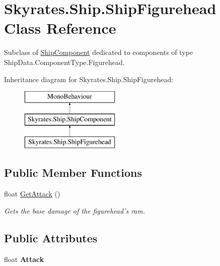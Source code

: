 \hypertarget{class_skyrates_1_1_ship_1_1_ship_figurehead}{\section{Skyrates.\-Ship.\-Ship\-Figurehead Class Reference}
\label{class_skyrates_1_1_ship_1_1_ship_figurehead}
}


Subclass of \hyperlink{class_skyrates_1_1_ship_1_1_ship_component}{Ship\-Component} dedicated to components of type Ship\-Data.\-Component\-Type.\-Figurehead.  


Inheritance diagram for Skyrates.\-Ship.\-Ship\-Figurehead\-:\begin{figure}[H]
\begin{center}
\leavevmode
\includegraphics[height=3.000000cm]{class_skyrates_1_1_ship_1_1_ship_figurehead}
\end{center}
\end{figure}
\subsection*{Public Member Functions}
\begin{DoxyCompactItemize}
\item 
float \hyperlink{class_skyrates_1_1_ship_1_1_ship_figurehead_adad224a00966a31095b2b1be9f627b17}{Get\-Attack} ()
\begin{DoxyCompactList}\small\item\em Gets the base damage of the figurehead's ram. \end{DoxyCompactList}\end{DoxyCompactItemize}
\subsection*{Public Attributes}
\begin{DoxyCompactItemize}
\item 
\hypertarget{class_skyrates_1_1_ship_1_1_ship_figurehead_a33b86cce8354edda7a2aefd8b6de960b}{float {\bfseries Attack}}\label{class_skyrates_1_1_ship_1_1_ship_figurehead_a33b86cce8354edda7a2aefd8b6de960b}

\end{DoxyCompactItemize}


